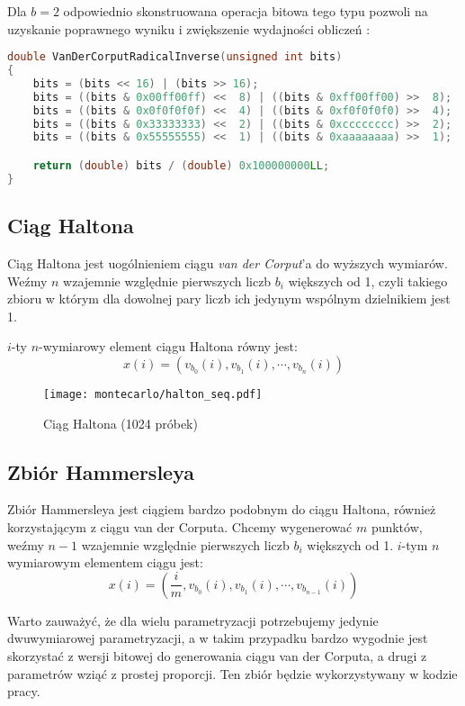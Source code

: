 \documentclass[../main.tex]{subfiles}
\begin{document}
Dla $b=2$ odpowiednio skonstruowana operacja bitowa tego typu pozwoli na
uzyskanie poprawnego wyniku i zwiększenie wydajności obliczeń
\cite{dammertz_2012,MultidimensionalSampling}:

\begin{lstlisting}[language=c++]
double VanDerCorputRadicalInverse(unsigned int bits)
{
	bits = (bits << 16) | (bits >> 16);
	bits = ((bits & 0x00ff00ff) <<  8) | ((bits & 0xff00ff00) >>  8);
	bits = ((bits & 0x0f0f0f0f) <<  4) | ((bits & 0xf0f0f0f0) >>  4);
	bits = ((bits & 0x33333333) <<  2) | ((bits & 0xcccccccc) >>  2);
	bits = ((bits & 0x55555555) <<  1) | ((bits & 0xaaaaaaaa) >>  1);

	return (double) bits / (double) 0x100000000LL;
}
\end{lstlisting}

\subsection{Ciąg Haltona}

Ciąg Haltona jest uogólnieniem ciągu \textit{van der Corput}'a do wyższych
wymiarów. Weźmy $n$ wzajemnie względnie pierwszych liczb $b_i$ większych od 1,
czyli takiego zbioru w którym dla dowolnej pary liczb ich jedynym wspólnym
dzielnikiem jest 1.

$i$-ty $n$-wymiarowy element ciągu Haltona równy jest:
\[ 
x(i) = \left( v_{b_0}(i), v_{b_1}(i), \cdots, v_{b_n}(i) \right) 
\]

\begin{figure}[h]
  \centering
  \texttt{[image: montecarlo/halton\_seq.pdf]}
  \caption{Ciąg Haltona (1024 próbek)}
  \label{fig:HaltonSamples}
\end{figure}

\subsection{Zbiór Hammersleya}

Zbiór Hammersleya jest ciągiem bardzo podobnym do ciągu Haltona, również
korzystającym z ciągu van der Corputa. Chcemy wygenerować $m$ punktów, weźmy
$n-1$ wzajemnie względnie pierwszych liczb $b_i$ większych od 1. $i$-tym $n$
wymiarowym elementem ciągu jest:
\[
  x(i) = \left(
    \frac{i}{m}, v_{b_0}(i), v_{b_1}(i), \cdots, v_{b_{n-1}}(i)
  \right)
\]

Warto zauważyć, że dla wielu parametryzacji potrzebujemy jedynie dwuwymiarowej
parametryzacji, a w takim przypadku bardzo wygodnie jest skorzystać z wersji
bitowej do generowania ciągu van der Corputa, a drugi z parametrów wziąć z
prostej proporcji. Ten zbiór będzie wykorzystywany w kodzie pracy.
\end{document}
